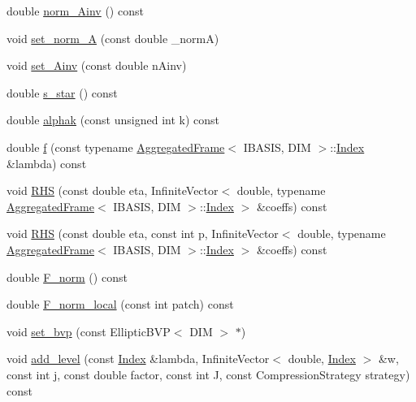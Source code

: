 \begin{CompactItemize}
\item 
double \hyperlink{classFrameTL_1_1SimpleEllipticEquation_4c74106d2957712ae44948082f2a92d5}{norm\_\-Ainv} () const 
\item 
void \hyperlink{classFrameTL_1_1SimpleEllipticEquation_2c56b637a942bd4543e7cbf6cd885244}{set\_\-norm\_\-A} (const double \_\-normA)
\item 
void \hyperlink{classFrameTL_1_1SimpleEllipticEquation_dace879d1d00d7e327a108c68451c714}{set\_\-Ainv} (const double nAinv)
\item 
double \hyperlink{classFrameTL_1_1SimpleEllipticEquation_26ed425b0ab5dc516bd626730d08c4af}{s\_\-star} () const 
\item 
double \hyperlink{classFrameTL_1_1SimpleEllipticEquation_aa99066841e723261103f2e7354eff92}{alphak} (const unsigned int k) const 
\item 
double \hyperlink{classFrameTL_1_1SimpleEllipticEquation_20fd2926333555fbd8c4ecf6d062c2e5}{f} (const typename \hyperlink{classFrameTL_1_1AggregatedFrame}{AggregatedFrame}$<$ IBASIS, DIM $>$::\hyperlink{classFrameTL_1_1FrameIndex}{Index} \&lambda) const 
\item 
void \hyperlink{classFrameTL_1_1SimpleEllipticEquation_2062b30008f73db23fa8b7415016ca00}{RHS} (const double eta, InfiniteVector$<$ double, typename \hyperlink{classFrameTL_1_1AggregatedFrame}{AggregatedFrame}$<$ IBASIS, DIM $>$::\hyperlink{classFrameTL_1_1FrameIndex}{Index} $>$ \&coeffs) const 
\item 
void \hyperlink{classFrameTL_1_1SimpleEllipticEquation_df01a8cf6b82866368e5c584a1fbbfa5}{RHS} (const double eta, const int p, InfiniteVector$<$ double, typename \hyperlink{classFrameTL_1_1AggregatedFrame}{AggregatedFrame}$<$ IBASIS, DIM $>$::\hyperlink{classFrameTL_1_1FrameIndex}{Index} $>$ \&coeffs) const 
\item 
double \hyperlink{classFrameTL_1_1SimpleEllipticEquation_ed4364c2a7db00b6c9076290b69147ad}{F\_\-norm} () const 
\item 
double \hyperlink{classFrameTL_1_1SimpleEllipticEquation_dc2e6668d1d7f143d1ce1a88e18eddc8}{F\_\-norm\_\-local} (const int patch) const 
\item 
void \hyperlink{classFrameTL_1_1SimpleEllipticEquation_56298192b4c795a3e2923d3c9175116e}{set\_\-bvp} (const EllipticBVP$<$ DIM $>$ $\ast$)
\item 
void \hyperlink{classFrameTL_1_1SimpleEllipticEquation_c21526eb37390ef77b7130e20c6ae000}{add\_\-level} (const \hyperlink{classFrameTL_1_1FrameIndex}{Index} \&lambda, InfiniteVector$<$ double, \hyperlink{classFrameTL_1_1FrameIndex}{Index} $>$ \&w, const int j, const double factor, const int J, const CompressionStrategy strategy) const 

\end{CompactItemize}
